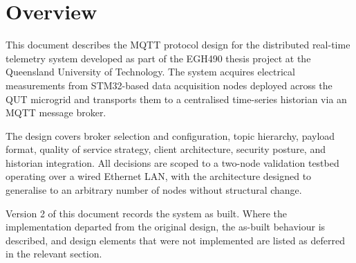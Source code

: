 \section{Overview}
This document describes the MQTT protocol design for the distributed real-time telemetry system developed as part of the EGH490 thesis project at the Queensland University of Technology. The system acquires electrical measurements from STM32-based data acquisition nodes deployed across the QUT microgrid and transports them to a centralised time-series historian via an MQTT message broker.

The design covers broker selection and configuration, topic hierarchy, payload format, quality of service strategy, client architecture, security posture, and historian integration. All decisions are scoped to a two-node validation testbed operating over a wired Ethernet LAN, with the architecture designed to generalise to an arbitrary number of nodes without structural change.

Version 2 of this document records the system as built. Where the implementation departed from the original design, the as-built behaviour is described, and design elements that were not implemented are listed as deferred in the relevant section.
